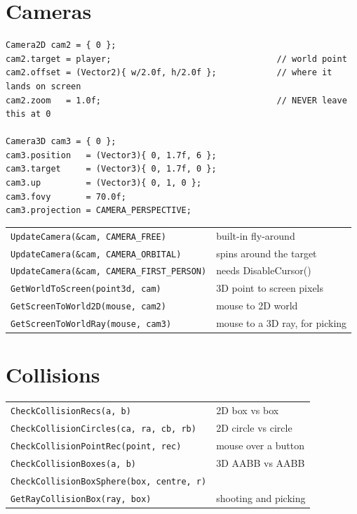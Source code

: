 \section{Cameras}

\begin{lstlisting}
Camera2D cam2 = { 0 };
cam2.target = player;                                 // world point
cam2.offset = (Vector2){ w/2.0f, h/2.0f };            // where it lands on screen
cam2.zoom   = 1.0f;                                   // NEVER leave this at 0

Camera3D cam3 = { 0 };
cam3.position   = (Vector3){ 0, 1.7f, 6 };
cam3.target     = (Vector3){ 0, 1.7f, 0 };
cam3.up         = (Vector3){ 0, 1, 0 };
cam3.fovy       = 70.0f;
cam3.projection = CAMERA_PERSPECTIVE;
\end{lstlisting}

\begin{center}
\begin{tabular}{@{}ll@{}}
\toprule
\lstinline|UpdateCamera(&cam, CAMERA_FREE)| & built-in fly-around \\
\lstinline|UpdateCamera(&cam, CAMERA_ORBITAL)| & spins around the target \\
\lstinline|UpdateCamera(&cam, CAMERA_FIRST_PERSON)| & needs DisableCursor() \\
\lstinline|GetWorldToScreen(point3d, cam)| & 3D point to screen pixels \\
\lstinline|GetScreenToWorld2D(mouse, cam2)| & mouse to 2D world \\
\lstinline|GetScreenToWorldRay(mouse, cam3)| & mouse to a 3D ray, for picking \\
\bottomrule
\end{tabular}
\end{center}

\section{Collisions}

\begin{center}
\begin{tabular}{@{}ll@{}}
\toprule
\lstinline|CheckCollisionRecs(a, b)| & 2D box vs box \\
\lstinline|CheckCollisionCircles(ca, ra, cb, rb)| & 2D circle vs circle \\
\lstinline|CheckCollisionPointRec(point, rec)| & mouse over a button \\
\lstinline|CheckCollisionBoxes(a, b)| & 3D AABB vs AABB \\
\lstinline|CheckCollisionBoxSphere(box, centre, r)| & \\
\lstinline|GetRayCollisionBox(ray, box)| & shooting and picking \\
\bottomrule
\end{tabular}
\end{center}

